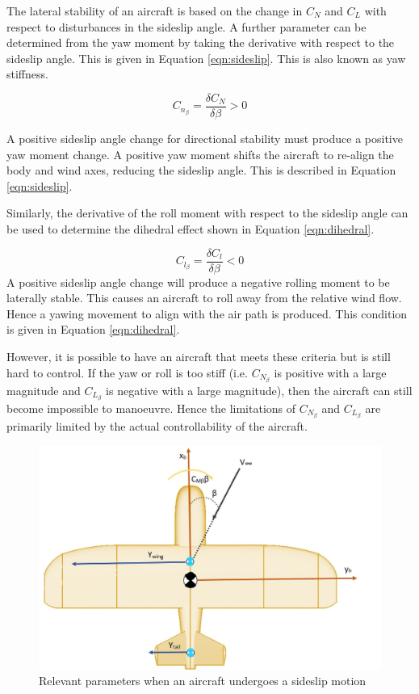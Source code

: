 The lateral stability of an aircraft is based on the change in $C_N$ and $C_L$ with respect to disturbances in the sideslip angle. A further parameter can be determined from the yaw moment by taking the derivative with respect to the sideslip angle. This is given in Equation \ref{eqn:sideslip}. This is also known as yaw stiffness.

\begin{equation}
    C_{n_\beta} = \frac{\delta C_N}{\delta \beta} > 0
    \label{eqn:sideslip}
\end{equation}


A positive sideslip angle change for directional stability must produce a positive yaw moment change. A positive yaw moment shifts the aircraft to re-align the body and wind axes, reducing the sideslip angle. This is described in Equation \ref{eqn:sideslip}. 

Similarly, the derivative of the roll moment with respect to the sideslip angle can be used to determine the dihedral effect shown in Equation \ref{eqn:dihedral}.

\begin{equation}
    C_{l_\beta} = \frac{\delta C_l}{\delta \beta} < 0
    \label{eqn:dihedral}
\end{equation}
A positive sideslip angle change will produce a negative rolling moment to be laterally stable. This causes an aircraft to roll away from the relative wind flow. Hence a yawing movement to align with the air path is produced. This condition is given in Equation \ref{eqn:dihedral}. 

However, it is possible to have an aircraft that meets these criteria but is still hard to control. If the yaw or roll is too stiff (i.e. $C_{N_\beta}$ is positive with a large magnitude and $C_{L_\beta}$ is negative with a large magnitude), then the aircraft can still become impossible to manoeuvre. Hence the limitations of $C_{N_\beta}$ and $C_{L_\beta}$ are primarily limited by the actual controllability of the aircraft. 




\begin{figure}[H]
  \centering
   \includegraphics[width=0.8\linewidth]{03_LiteratureReview/Figs/sideslip.JPG}
  \caption{Relevant parameters when an aircraft undergoes a sideslip motion}
  \label{fig:sideslip}
\end{figure}


